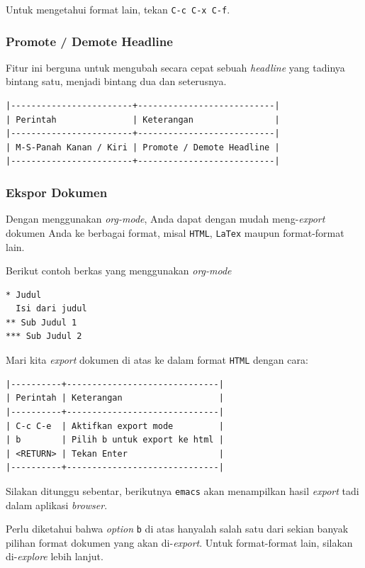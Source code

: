 \documentclass{article}
\begin{document}
Untuk mengetahui format lain, tekan \texttt{C-c C-x C-f}.

\subsubsection{Promote / Demote Headline}
Fitur ini berguna untuk mengubah secara cepat sebuah \emph{headline} yang
tadinya bintang satu, menjadi bintang dua dan seterusnya.

\begin{verbatim}
|------------------------+---------------------------|
| Perintah               | Keterangan                |
|------------------------+---------------------------|
| M-S-Panah Kanan / Kiri | Promote / Demote Headline |
|------------------------+---------------------------|
\end{verbatim}

\subsubsection{Ekspor Dokumen}
Dengan menggunakan \emph{org-mode}, Anda dapat dengan mudah meng-\emph{export}
dokumen Anda ke berbagai format, misal \verb=HTML=, \verb=LaTex= maupun 
format-format lain.

Berikut contoh berkas yang menggunakan \emph{org-mode}

\begin{verbatim}
* Judul
  Isi dari judul
** Sub Judul 1
*** Sub Judul 2
\end{verbatim}

Mari kita \emph{export} dokumen di atas ke dalam format \verb=HTML= dengan cara:

\begin{verbatim}
|----------+------------------------------|
| Perintah | Keterangan                   |
|----------+------------------------------|
| C-c C-e  | Aktifkan export mode         |
| b        | Pilih b untuk export ke html |
| <RETURN> | Tekan Enter                  |
|----------+------------------------------|
\end{verbatim}

Silakan ditunggu sebentar, berikutnya \verb=emacs= akan menampilkan hasil
\emph{export} tadi dalam aplikasi \emph{browser}.

Perlu diketahui bahwa \emph{option} \verb=b= di atas hanyalah salah satu dari
sekian banyak pilihan format dokumen yang akan di-\emph{export}. Untuk 
format-format lain, silakan di-\emph{explore} lebih lanjut.
\end{document}
